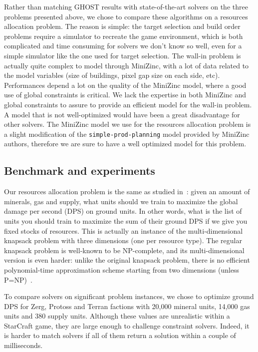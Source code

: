 \documentclass[journal]{IEEEtran}
\newcommand{\minormod}[1]{\color{red} #1\color{black} \xspace}
\newcommand{\ghost}{\textsc{GHOST}\xspace}
\begin{document}
Rather than  matching \ghost results with  state-of-the-art solvers on
the  three  problems  presented  above, we  chose  to  compare  these
algorithms on  a resources allocation  problem. The reason  is simple:
the target selection  and build order problems require  a simulator to
recreate  the game  environment, which  is both  complicated and  time
consuming  for solvers  we  don't  know so  well,  even  for a  simple
simulator like the one used  for target selection. The wall-in problem
is actually quite complex to model through MiniZinc, with a lot of data
related to the  model variables (size of buildings, pixel  gap size on
each side,  etc).  Performances  depend a  lot on  the quality  of the
MiniZinc model, where a good use of global constraints is critical. We
lack the expertise in both  MiniZinc and  global constraints  to
assure to provide  an efficient model for the wall-in  problem.  A model
that is not well-optimized  would have  been a great disadvantage  for other
solvers.   The MiniZinc  model  we use  for  the resources  allocation
problem  is a  slight  modification  of the {\tt simple-prod-planning} model  provided by  MiniZinc
authors, therefore we are sure to have a well optimized model for this problem.

\subsection{Benchmark and experiments}

Our resources allocation problem is the same as studied
in~\cite{aiide15_rts}: given an amount of minerals, gas and supply,
what units should we train to maximize the global damage per second
(DPS) on ground units. \minormod{In other words, what is the list of
  units you should train to maximize the sum of their ground DPS if we
  give you fixed stocks of resources.}  This is actually an instance
of the multi-dimensional knapsack problem with three dimensions (one
per resource type). The regular knapsack problem is well-known to be
NP-complete, and its multi-dimensional version is even harder: unlike
the original knapsack problem, there is no efficient polynomial-time
approximation scheme starting from two dimensions (unless
P=NP)~\cite{KulikS10}.

To  compare solvers  on  significant problem  instances,  we chose  to
optimize ground DPS for Zerg,  Protoss and Terran factions with 20,000
mineral units, 14,000  gas units and 380 supply  units. Although these
values are unrealistic within a  StarCraft game, they are large enough
to challenge constraint solvers. Indeed, it is harder to match solvers
if all of them return a solution within a couple of milliseconds.
\end{document}
